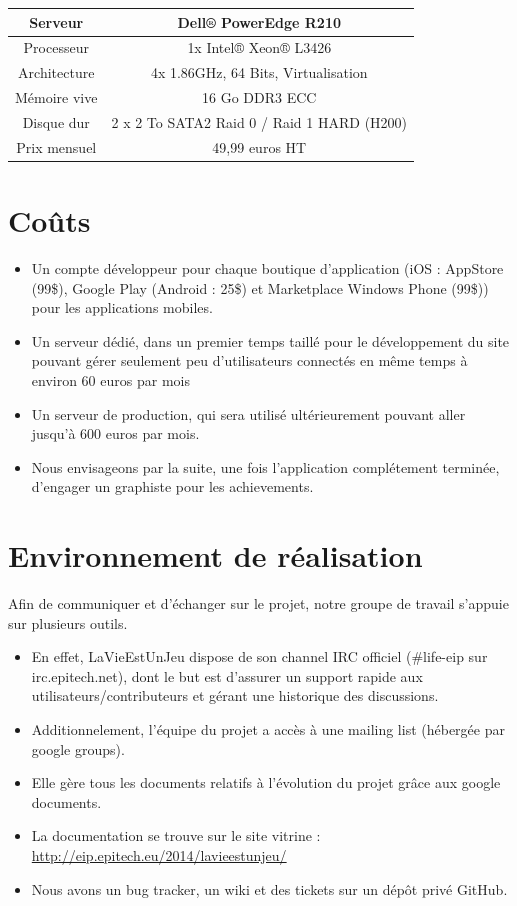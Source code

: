 \documentclass{life-fr}
\begin{document}
\vspace{20pt}

\begin{tabular}{|c|c|}
  \hline
   Serveur & Dell® PowerEdge R210\\
  \hline
  Processeur & 1x Intel® Xeon® L3426\\
  \hline
  Architecture & 4x 1.86GHz, 64 Bits, Virtualisation\\
  \hline
  Mémoire vive & 16 Go DDR3 ECC\\
  \hline
  Disque dur & 2 x 2 To SATA2 Raid 0 / Raid 1 HARD (H200)\\
  \hline
  Prix mensuel & 49,99 euros HT\\
  \hline
\end{tabular}

\vspace{20pt}

\section{Coûts}

\begin{itemize}
  \item Un compte développeur pour chaque boutique d'application (iOS : AppStore (99\$), Google Play (Android : 25\$) et Marketplace Windows Phone (99\$)) pour les applications mobiles.
  \item Un serveur dédié, dans un premier temps taillé pour le développement du site pouvant gérer seulement peu d'utilisateurs connectés en même temps à environ 60 euros par mois
  \item Un serveur de production, qui sera utilisé ultérieurement pouvant aller jusqu'à 600 euros par mois.
  \item Nous envisageons par la suite, une fois l'application complétement terminée, d'engager un graphiste pour les achievements.
\end{itemize}

\section{Environnement de réalisation}

Afin de communiquer et d’échanger sur le projet, notre groupe de travail s’appuie sur plusieurs outils.

\begin{itemize}
  \item En effet, LaVieEstUnJeu dispose de son channel IRC officiel (\#life-eip sur irc.epitech.net), dont le but est d’assurer un support rapide aux utilisateurs/contributeurs et gérant une historique des discussions.
  \item Additionnelement, l’équipe du projet a accès à une mailing list (hébergée par google groups).
  \item Elle gère tous les documents relatifs à l’évolution du projet grâce aux google documents.
  \item La documentation se trouve sur le site vitrine : \url{http://eip.epitech.eu/2014/lavieestunjeu/}
  \item Nous avons un bug tracker, un wiki et des tickets sur un dépôt privé GitHub.
\end{itemize}
\end{document}
